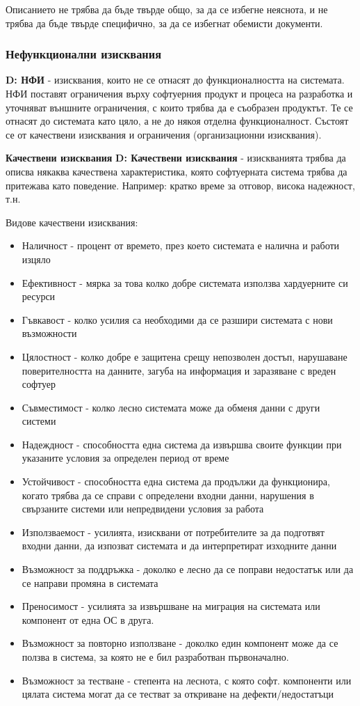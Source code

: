 \documentclass[fleqn,12pt]{article}
\begin{document}
Описанието не трябва да бъде твърде общо, за да се избегне неяснота, и не трябва да бъде твърде специфично, за да се избегнат обемисти документи.


\subsubsection{Нефункционални изисквания}
\textbf{D: НФИ} - изисквания, които не се отнасят до функционалността на системата. НФИ поставят ограничения върху софтуерния продукт и процеса на разработка и уточняват външните ограничения, с които трябва да е съобразен продуктът. Те се отнасят до системата като цяло, а не до някоя отделна функционалност. Състоят се от качествени изисквания и ограничения (организационни изисквания).

\bigbreak
\textbf{Качествени изисквания}
\bigbreak
\textbf{D: Качествени изисквания} - изискванията трябва да описва някаква качествена характеристика, която софтуерната система трябва да притежава като поведение. Например: кратко време за отговор, висока надежност, т.н.

Видове качествени изисквания:
\begin{itemize}
	\item Наличност - процент от времето, през което системата е налична и работи изцяло
	\item Ефективност - мярка за това колко добре системата използва хардуерните си ресурси
	\item Гъвкавост - колко усилия са необходими да се разшири системата с нови възможности
	\item Цялостност -  колко добре е защитена срещу непозволен достъп, нарушаване поверителността на данните, загуба на информация и заразяване с вреден софтуер
	\item Съвместимост - колко лесно системата може да обменя данни с други системи
	\item Надеждност - способността една система да извършва своите функции при указаните условия за определен период от време
	\item Устойчивост - способността една система да продължи да функционира, когато трябва да се справи с определени входни данни, нарушения в свързаните системи или непредвидени условия за работа
	\item Използваемост - усилията, изисквани от потребителите за да подготвят входни данни, да изпозват системата и да интерпретират изходните данни
	\item Възможност за поддръжка - доколко е лесно да се поправи недостатък или да се направи промяна в системата
	\item Преносимост - усилията за извършване на миграция на системата или компонент от една ОС в друга.
	\item Възможност за повторно използване - доколко един компонент може да се ползва в система, за която не е бил разработван първоначално.
	\item Възможност за тестване - степента на леснота, с която софт. компоненти или цялата система могат да се тестват за откриване на дефекти/недостатъци
\end{itemize}
\end{document}
